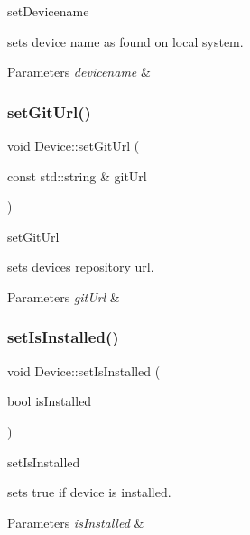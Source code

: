 set\+Devicename 

sets device name as found on local system. 
\begin{DoxyParams}{Parameters}
{\em devicename} & \\
\hline
\end{DoxyParams}
\mbox{\label{classDevice_ae8587aa062a7a2f2b5b77e9a15569e53}} 
\subsubsection{\texorpdfstring{set\+Git\+Url()}{setGitUrl()}}
{\footnotesize\ttfamily void Device\+::set\+Git\+Url (\begin{DoxyParamCaption}\item[{const std\+::string \&}]{git\+Url }\end{DoxyParamCaption})}



set\+Git\+Url 

sets device\textquotesingle{}s repository url. 
\begin{DoxyParams}{Parameters}
{\em git\+Url} & \\
\hline
\end{DoxyParams}
\mbox{\label{classDevice_aec222a879b4a9aadd1a083a7aff2e516}} 
\subsubsection{\texorpdfstring{set\+Is\+Installed()}{setIsInstalled()}}
{\footnotesize\ttfamily void Device\+::set\+Is\+Installed (\begin{DoxyParamCaption}\item[{bool}]{is\+Installed }\end{DoxyParamCaption})\hspace{0.3cm}{\ttfamily [inline]}}



set\+Is\+Installed 

sets true if device is installed. 
\begin{DoxyParams}{Parameters}
{\em is\+Installed} & \\
\hline
\end{DoxyParams}
\mbox{\label{classDevice_a3b5d4af66cacd8e1b0e45219c16ee084}} 
